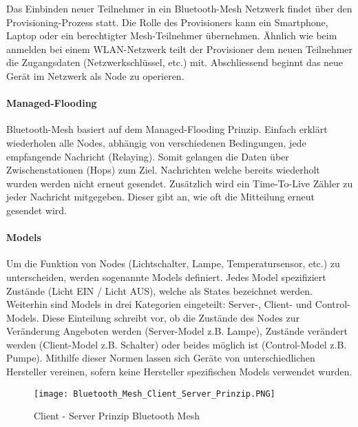 Das Einbinden neuer Teilnehmer in ein Bluetooth-Mesh Netzwerk findet über den Provisioning-Prozess statt. Die Rolle des Provisioners kann ein Smartphone, Laptop oder ein berechtigter Mesh-Teilnehmer übernehmen. Ähnlich wie beim anmelden bei einem WLAN-Netzwerk teilt der Provisioner dem neuen Teilnehmer die Zugangsdaten (Netzwerkschlüssel, etc.) mit. Abschliessend beginnt das neue Gerät im Netzwerk als Node zu operieren. \\

\paragraph{Managed-Flooding}

Bluetooth-Mesh basiert auf dem Managed-Flooding Prinzip. Einfach erklärt wiederholen alle Nodes, abhängig von verschiedenen Bedingungen, jede empfangende Nachricht (Relaying). Somit gelangen die Daten über Zwischenstationen (Hops) zum Ziel. Nachrichten welche bereits  wiederholt wurden werden nicht erneut gesendet. Zusätzlich wird ein Time-To-Live Zähler zu jeder Nachricht mitgegeben. Dieser gibt an, wie oft die Mitteilung erneut gesendet wird. \\

\paragraph{Models}

Um die Funktion von Nodes (Lichtschalter, Lampe, Temperatursensor, etc.) zu unterscheiden, werden sogenannte Models definiert. Jedes Model spezifiziert Zustände (Licht EIN / Licht AUS), welche als States bezeichnet werden. Weiterhin sind Models in drei Kategorien eingeteilt: Server-, Client- und Control-Models. Diese Einteilung schreibt vor, ob die Zustände des Nodes zur Veränderung Angeboten werden (Server-Model z.B. Lampe), Zustände verändert werden (Client-Model z.B. Schalter) oder beides möglich ist (Control-Model z.B. Pumpe). Mithilfe dieser Normen lassen sich Geräte von unterschiedlichen Hersteller vereinen, sofern keine Hersteller spezifischen Models verwendet wurden. 

\begin{figure} [H]
	\centering
	\texttt{[image: Bluetooth\_Mesh\_Client\_Server\_Prinzip.PNG]}
	\caption{Client - Server Prinzip Bluetooth Mesh \cite{bluetooth_sig_mesh-technology-overviewpdf_2020}} 
	\label{fig:BTMeshClientServerPrinzip}
\end{figure}


